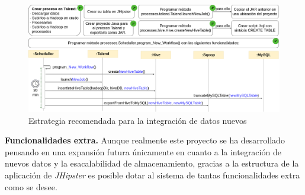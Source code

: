 \begin{figure}[!h]
    \centering
    \includegraphics[width=\textwidth,height=\textheight,keepaspectratio]{Imagenes/expansion}
    \caption{Estrategia recomendada para la integración de datos nuevos}
    \label{fig:expansion}
\end{figure}
\textbf{Funcionalidades extra.} Aunque realmente este proyecto se ha desarrollado pensando en una expansión futura únicamente en cuanto a la integración de nuevos datos y la esacalabilidad de almacenamiento, gracias a la estructura de la aplicación de \textit{JHipster} es posible dotar al sistema de tantas funcionalidades extra como se desee. 

